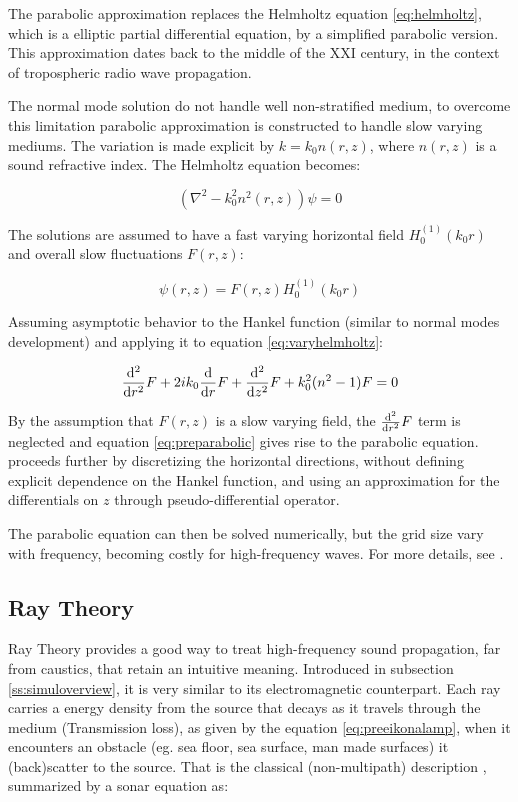 The parabolic approximation replaces the Helmholtz equation \ref{eq:helmholtz},
which is a elliptic partial differential equation, by a simplified parabolic
version. This approximation dates back to the middle of the $\mathrm{XXI}$
century, in the context of tropospheric radio wave propagation.

The normal mode solution do not handle well non-stratified medium, to overcome
this limitation parabolic approximation is constructed to handle slow varying
mediums. The variation is made explicit by $k = k_0n(r,z)$, where $n(r,z)$ is a
sound refractive index\cite{LURTON}. The Helmholtz equation becomes:

\begin{equation}
\label{eq:varyhelmholtz}
(\nabla^2 - k_0^2n^2(r,z))\psi = 0 
\end{equation}

The solutions are assumed to have a fast varying horizontal field
$H_0^{(1)}(k_0r)$ and overall slow fluctuations $F(r,z)$:

\begin{equation*}
\psi(r,z) = F(r,z)H_0^{(1)}(k_0r)
\end{equation*}

Assuming asymptotic behavior to the Hankel function (similar to normal modes
development) and applying it to equation \ref{eq:varyhelmholtz}:

\begin{equation}
\label{eq:preparabolic}
\frac{\mathrm{d^{2}}}{\mathrm{d}{r}^{2}}F + 2ik_0\frac{\mathrm{d}}{\mathrm{d}r}F + \frac{\mathrm{d^{2}}}{\mathrm{d}{z}^{2}}F + k_0^2(n^2-1)F = 0
\end{equation}

By the assumption that $F(r,z)$ is a slow varying field, the $\frac{\mathrm{d^{2}}}{\mathrm{d}{r}^{2}}F$
term is neglected and equation \ref{eq:preparabolic} gives rise to the parabolic
equation. \citet{LURTON} proceeds further by discretizing the horizontal
directions, without defining explicit dependence on the Hankel function, and
using an approximation for the differentials on $z$ through pseudo-differential
operator.

The parabolic equation can then be solved numerically, but the grid size vary
with frequency, becoming costly for high-frequency waves. For more
details, see \citet{jensen2011computational}.

\subsection{Ray Theory}
\label{ss:raytheory}

Ray Theory provides a good way to treat high-frequency sound propagation,
far from caustics, that retain an intuitive meaning. Introduced in subsection
\ref{ss:simuloverview}, it is very similar to its electromagnetic counterpart.
Each ray carries a energy density from the source that decays as it travels
through the medium (Transmission loss), as given by the equation
\ref{eq:preeikonalamp}, when it encounters an obstacle (eg. sea floor, sea
surface, man made surfaces) it (back)scatter to the source. That is the
classical (non-multipath) description
\cite{LURTON,Etter2013,miller2015real,bell1997application}, summarized by a
sonar equation as:

